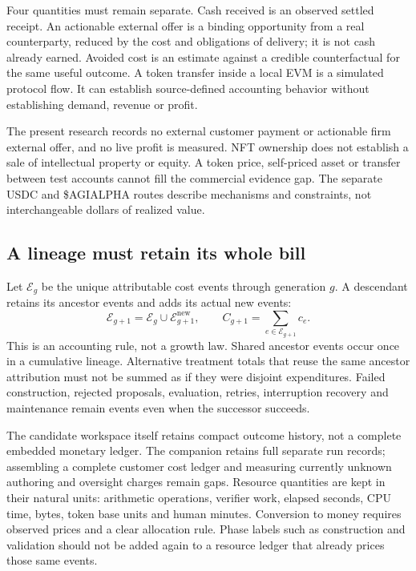 \documentclass[11pt]{article}
\begin{document}
Four quantities must remain separate. Cash received is an observed settled receipt. An actionable external offer is a binding opportunity from a real counterparty, reduced by the cost and obligations of delivery; it is not cash already earned. Avoided cost is an estimate against a credible counterfactual for the same useful outcome. A token transfer inside a local EVM is a simulated protocol flow. It can establish source-defined accounting behavior without establishing demand, revenue or profit.

The present research records no external customer payment or actionable firm external offer, and no live profit is measured. NFT ownership does not establish a sale of intellectual property or equity. A token price, self-priced asset or transfer between test accounts cannot fill the commercial evidence gap. The separate USDC and \$AGIALPHA routes describe mechanisms and constraints, not interchangeable dollars of realized value.

\subsection{A lineage must retain its whole bill}

Let $\mathcal E_g$ be the unique attributable cost events through generation $g$. A descendant retains its ancestor events and adds its actual new events:
\begin{equation}
\mathcal E_{g+1}=\mathcal E_g\cup\mathcal E^{\mathrm{new}}_{g+1},\qquad
C_{g+1}=\sum_{e\in\mathcal E_{g+1}}c_e.
\label{eq:lineagecost}
\end{equation}
This is an accounting rule, not a growth law. Shared ancestor events occur once in a cumulative lineage. Alternative treatment totals that reuse the same ancestor attribution must not be summed as if they were disjoint expenditures. Failed construction, rejected proposals, evaluation, retries, interruption recovery and maintenance remain events even when the successor succeeds.

The candidate workspace itself retains compact outcome history, not a complete embedded monetary ledger. The companion retains full separate run records; assembling a complete customer cost ledger and measuring currently unknown authoring and oversight charges remain gaps. Resource quantities are kept in their natural units: arithmetic operations, verifier work, elapsed seconds, CPU time, bytes, token base units and human minutes. Conversion to money requires observed prices and a clear allocation rule. Phase labels such as construction and validation should not be added again to a resource ledger that already prices those same events.
\end{document}
